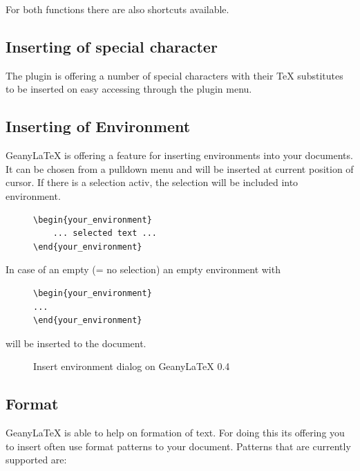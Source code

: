 \documentclass[%
paper=a4,%
fontsize=11pt,%
twoside=false,%
DIV18,
headsepline,
plainheadsepline,
footsepline,
plainfootsepline,
bibliography=totoc,%
listof=totoc,%
BCOR10mm,%
parskip=half,%
openany,%
]{scrartcl}
\begin{document}
For both functions there are also shortcuts available.

\subsection{Inserting of special character}
The plugin is offering a number of special characters with their \TeX{}
substitutes to be inserted on easy accessing through the plugin menu.

\subsection{Inserting of Environment}
Geany\LaTeX{} is offering a feature for inserting environments into your
documents. It can be chosen from a pulldown menu and will be inserted at
current position of cursor. If there is a selection activ, the selection
will be included into environment.

\begin{figure}[h!]
\begin{lstlisting}
\begin{your_environment}
	... selected text ...
\end{your_environment}
\end{lstlisting}
\end{figure}

In case of an empty (= no selection) an empty environment with
\begin{figure}[h!]
\begin{lstlisting}
\begin{your_environment}
...
\end{your_environment}
\end{lstlisting}
\end{figure}

will be inserted to the document.

\begin{figure}[h!]
	\caption{Insert environment dialog on Geany\LaTeX{} 0.4}
\end{figure}


\subsection{Format}
Geany\LaTeX{} is able to help on formation of text. For doing this its
offering you to insert often use format patterns to your document.
Patterns that are currently supported are:
\end{document}
